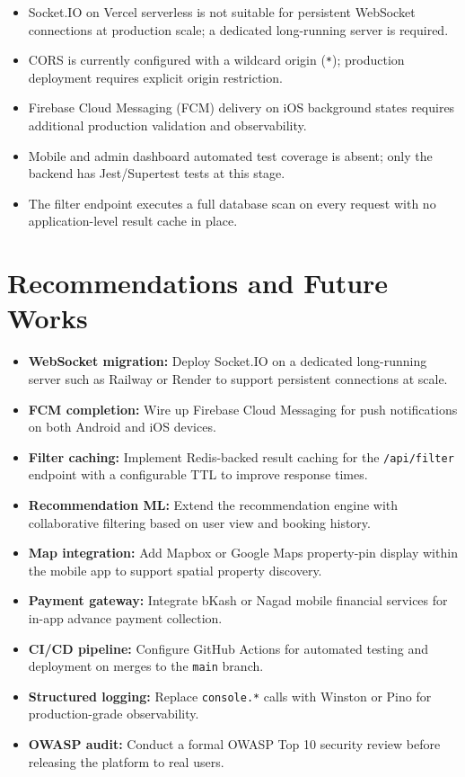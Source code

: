 \documentclass[12pt,a4paper]{report}
\begin{document}
\begin{itemize}[noitemsep]
  \item Socket.IO on Vercel serverless is not suitable for persistent WebSocket connections
        at production scale; a dedicated long-running server is required.
  \item CORS is currently configured with a wildcard origin (\texttt{*}); production
        deployment requires explicit origin restriction.
  \item Firebase Cloud Messaging (FCM) delivery on iOS background states requires
        additional production validation and observability.
  \item Mobile and admin dashboard automated test coverage is absent; only the backend
        has Jest/Supertest tests at this stage.
  \item The filter endpoint executes a full database scan on every request with no
        application-level result cache in place.
\end{itemize}

\section{Recommendations and Future Works}

\begin{itemize}[noitemsep]
  \item \textbf{WebSocket migration:} Deploy Socket.IO on a dedicated long-running
        server such as Railway or Render to support persistent connections at scale.
  \item \textbf{FCM completion:} Wire up Firebase Cloud Messaging for push notifications
        on both Android and iOS devices.
  \item \textbf{Filter caching:} Implement Redis-backed result caching for the
        \texttt{/api/filter} endpoint with a configurable TTL to improve response times.
  \item \textbf{Recommendation ML:} Extend the recommendation engine with
        collaborative filtering based on user view and booking history.
  \item \textbf{Map integration:} Add Mapbox or Google Maps property-pin display within
        the mobile app to support spatial property discovery.
  \item \textbf{Payment gateway:} Integrate bKash or Nagad mobile financial services for
        in-app advance payment collection.
  \item \textbf{CI/CD pipeline:} Configure GitHub Actions for automated testing and
        deployment on merges to the \texttt{main} branch.
  \item \textbf{Structured logging:} Replace \texttt{console.*} calls with Winston or Pino
        for production-grade observability.
  \item \textbf{OWASP audit:} Conduct a formal OWASP Top 10 security review before
        releasing the platform to real users.
\end{itemize}
\end{document}
